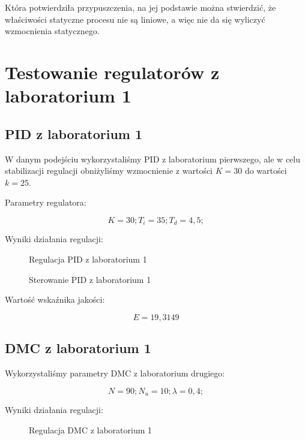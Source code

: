 Która potwierdziła przypuszczenia, na jej podstawie można stwierdzić, że właściwości statyczne procesu nie są liniowe, a więc nie da się wyliczyć wzmocnienia statycznego.

\section{Testowanie regulatorów z laboratorium 1}

\subsection{PID z laboratorium 1}

W danym podejściu wykorzystaliśmy PID z laboratorium pierwszego, ale w celu stabilizacji regulacji obniżyliśmy wzmocnienie z wartości $K = 30$ do wartości $k = 25$.

Parametry regulatora:

\begin{equation}
K = 30; 
T_i = 35; 
T_d = 4,5; 
\end{equation}

Wyniki działania regulacji:

\begin{figure}[H]
\centering

\caption{Regulacja PID z laboratorium 1}
\end{figure}

\begin{figure}[H]
\centering

\caption{Sterowanie PID z laboratorium 1}
\end{figure}

Wartość wskaźnika jakości:

\begin{equation}
E = 19,3149
\end{equation}

\subsection{DMC z laboratorium 1}

Wykorzystaliśmy parametry DMC z laboratorium drugiego:

\begin{equation}
N = 90; 
N_u = 10; 
\lambda = 0,4; 
\end{equation}
 
Wyniki działania regulacji:

\begin{figure}[H]
\centering

\caption{Regulacja DMC z laboratorium 1}
\end{figure}

